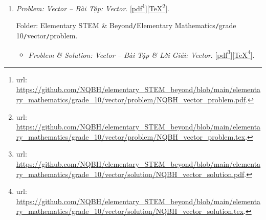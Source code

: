\documentclass[12pt,twoside]{book}
\begin{document}
\begin{enumerate}
\begin{itemize}
		Folder: {\sf Elementary STEM \& Beyond{\tt/}Elementary Mathematics{\tt/}grade 10{\tt/}trigonometry{\tt/}solution}.
	\end{itemize}
	{\it A bridge between Elementary Algebra \& Elementary Geometric $+$ Trigonometric -- Nhịp cầu nối giữa Đại Số Sơ Cấp với Hình Học Sơ Cấp \& Lượng giác}: Các yếu tố hình học \& lượng giác của tam giác, e.g., cạnh $a,b,c$, đường cao $h_a,h_b,h_c$, đường trung tuyến $m_a,m_b,m_c$, đường phân giác trong $l_a,l_b,l_c$, các bán kính đường tròn nội tiếp $r$, ngoại tiếp $R$, bàng tiếp $r_a,r_b,r_c,\ldots$ \& các tỷ số lượng giác $\sin,\cos,\tan,\cot,\ldots$ các góc $\angle A,\angle B,\angle C$ của tam giác, chính là các nghiệm của phương trình bậc 3 (3rd-degree polynomial equation or cubic equation) mà các hệ số phụ thuộc vào 3 yếu tố cơ bản $p,R,r$, lần lượt là nửa chu vi, bán kính đường tròn ngoại tiếp, nội tiếp của tam giác, see \cite{Phuong_Quan_ptb3_htl}.
	\item {\it Problem: Vector -- Bài Tập: Vector}. [\href{https://github.com/NQBH/elementary_STEM_beyond/blob/main/elementary_mathematics/grade_10/vector/problem/NQBH_vector_problem.pdf}{pdf}\footnote{{\sc url}: \url{https://github.com/NQBH/elementary_STEM_beyond/blob/main/elementary_mathematics/grade_10/vector/problem/NQBH_vector_problem.pdf}.}][\href{https://github.com/NQBH/elementary_STEM_beyond/blob/main/elementary_mathematics/grade_10/vector/problem/NQBH_vector_problem.tex}{\TeX}\footnote{{\sc url}: \url{https://github.com/NQBH/elementary_STEM_beyond/blob/main/elementary_mathematics/grade_10/vector/problem/NQBH_vector_problem.tex}.}].
	
	Folder: {\sf Elementary STEM \& Beyond{\tt/}Elementary Mathematics{\tt/}grade 10{\tt/}vector{\tt/}problem}.
	\begin{itemize}
		\item {\it Problem \& Solution: Vector -- Bài Tập \& Lời Giải: Vector}. [\href{https://github.com/NQBH/elementary_STEM_beyond/blob/main/elementary_mathematics/grade_10/vector/solution/NQBH_vector_solution.pdf}{pdf}\footnote{{\sc url}: \url{https://github.com/NQBH/elementary_STEM_beyond/blob/main/elementary_mathematics/grade_10/vector/solution/NQBH_vector_solution.pdf}.}][\href{https://github.com/NQBH/elementary_STEM_beyond/blob/main/elementary_mathematics/grade_10/vector/solution/NQBH_vector_solution.tex}{\TeX}\footnote{{\sc url}: \url{https://github.com/NQBH/elementary_STEM_beyond/blob/main/elementary_mathematics/grade_10/vector/solution/NQBH_vector_solution.tex}.}].
		

\end{itemize}
\end{enumerate}
\end{document}
